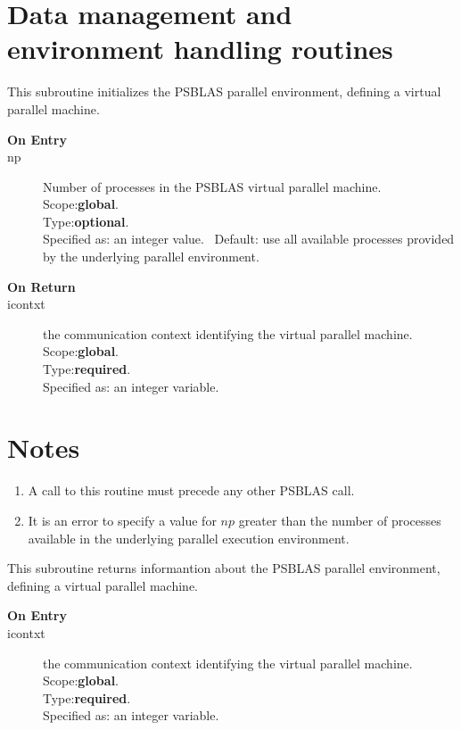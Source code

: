\section{Data management and environment handling  routines}
\label{sec:toolsrout}



This subroutine initializes the PSBLAS parallel environment, defining
a virtual parallel machine.
\begin{description}
\item[\bf  On Entry ]
\item[np] Number of processes in the PSBLAS virtual parallel machine.\\
Scope:{\bf global}.\\
Type:{\bf optional}.\\
Specified as: an integer value. \
Default: use all available processes provided by the underlying
parallel environment.
\end{description}

\begin{description}
\item[\bf On Return]
\item[icontxt] the communication context identifying the virtual
  parallel machine.\\
Scope:{\bf global}.\\
Type:{\bf required}.\\
Specified as: an integer variable.
\end{description}


\section*{Notes}
\begin{enumerate}
\item A call to this routine must precede any other PSBLAS call. 
\item It is an error to specify a value for $np$ greater than the
  number of processes available in the underlying parallel execution
  environment. 
\end{enumerate}




This subroutine returns informantion about  the PSBLAS parallel environment, defining
a virtual parallel machine.
\begin{description}
\item[\bf  On Entry ]
\item[icontxt] the communication context identifying the virtual
  parallel machine.\\
Scope:{\bf global}.\\
Type:{\bf required}.\\
Specified as: an integer variable.
\end{description}

